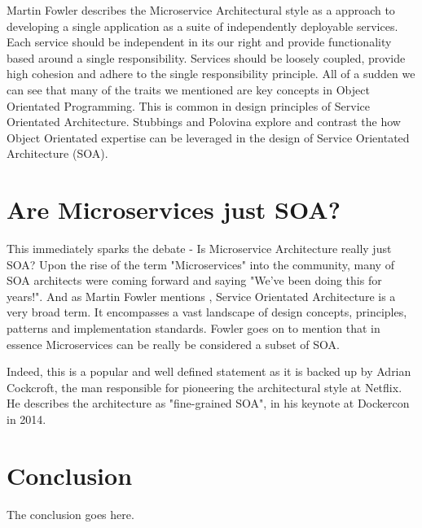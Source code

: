 \documentclass[journal]{IEEEtran}
\begin{document}
Martin Fowler describes the Microservice Architectural style as a approach to developing a single application as a suite of independently deployable services. \cite{MicroservicesResourceGuide} Each service should be independent in its our right and provide functionality based around a single responsibility. Services should be loosely coupled, provide high cohesion and adhere to the single responsibility principle. All of a sudden we can see that many of the traits we mentioned are key concepts in Object Orientated Programming. This is common in design principles of Service Orientated Architecture. Stubbings and Polovina \cite{StubbingsPolovina} explore and contrast the how Object Orientated expertise can be leveraged in the design of Service Orientated Architecture (SOA).



\section{Are Microservices just SOA?}

This immediately sparks the debate - Is Microservice Architecture really just SOA? Upon the rise of the term "Microservices" into the community, many of SOA architects were coming forward and saying "We've been doing this for years!". And as Martin Fowler mentions \cite{GOTOConference}, Service Orientated Architecture is a very broad term. It encompasses a vast landscape of design concepts, principles, patterns and implementation standards. Fowler goes on to mention that in essence Microservices can be really be considered a subset of SOA.

Indeed, this is a popular and well defined statement as it is backed up by Adrian Cockcroft, the man responsible for pioneering the architectural style at Netflix. He describes the architecture as "fine-grained SOA", in his keynote at Dockercon in 2014. \cite{adriancockcroft} 

\section{Conclusion}
The conclusion goes here.

\newpage
\printbibliography

\end{document}
